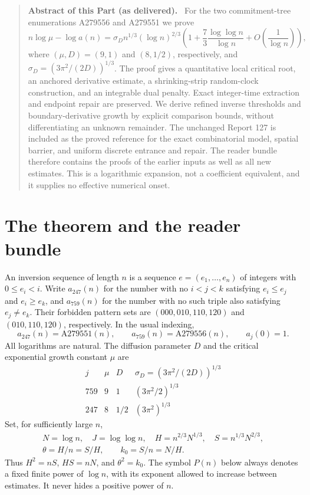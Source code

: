 \documentclass[11pt,letterpaper]{article}
\theoremstyle{remark}\newtheorem{remark}[theorem]{Remark}
\numberwithin{equation}{section}
\newenvironment{partabstract}{\begin{quote}\small\noindent\textbf{Abstract of this Part (as delivered).}\ }{\end{quote}}
\begin{document}
\begin{partabstract}
For the two commitment-tree enumerations A279556 and A279551 we prove
\[
 n\log\mu-\log a(n)=\sigma_D n^{1/3}(\log n)^{2/3}
 \left(1+\frac73\frac{\log\log n}{\log n}
                 +O\!\left(\frac1{\log n}\right)\right),
\]
where $(\mu,D)=(9,1)$ and $(8,1/2)$, respectively, and
$\sigma_D=(3\pi^2/(2D))^{1/3}$. The proof gives a quantitative local
critical root, an anchored derivative estimate, a shrinking-strip
random-clock construction, and an integrable dual penalty. Exact
integer-time extraction and endpoint repair are preserved. We derive
refined inverse thresholds and boundary-derivative growth by explicit
comparison bounds, without differentiating an unknown remainder.
The unchanged Report 127 is included as the proved reference for the
exact combinatorial model, spatial barrier, and uniform discrete
entrance and repair. The reader bundle therefore contains the proofs
of the earlier inputs as well as all new estimates. This is a
logarithmic expansion, not a coefficient equivalent, and it supplies
no effective numerical onset.
\end{partabstract}


\section{The theorem and the reader bundle}\label{ivd:ll:sec:theorem}
An inversion sequence of length $n$ is a sequence $e=(e_1,\ldots,e_n)$
of integers with $0\le e_i<i$. Write $a_{247}(n)$ for the number with
no $i<j<k$ satisfying $e_i\le e_j$ and $e_i\ge e_k$, and $a_{759}(n)$
for the number with no such triple also satisfying $e_j\ne e_k$.
Their forbidden pattern sets are $(000,010,110,120)$ and
$(010,110,120)$, respectively. In the usual indexing,
\[
 a_{247}(n)=\mathrm{A279551}(n),\qquad
 a_{759}(n)=\mathrm{A279556}(n),\qquad a_j(0)=1.
\]
All logarithms are natural. The diffusion parameter $D$ and the
critical exponential growth constant $\mu$ are
\[
\begin{array}{c|ccc}
 j&\mu&D&\sigma_D=(3\pi^2/(2D))^{1/3}\\\hline
 759&9&1&(3\pi^2/2)^{1/3}\\
 247&8&1/2&(3\pi^2)^{1/3}
\end{array}
\]
Set, for sufficiently large $n$,
\begin{equation}\label{ivd:ll:eq:scales}
 \begin{gathered}
 N=\log n,\quad J=\log\log n,\quad
 H=n^{2/3}N^{1/3},\quad S=n^{1/3}N^{2/3},\\
 \theta=H/n=S/H,\qquad k_0=S/n=N/H.
 \end{gathered}
\end{equation}
Thus $H^2=nS$, $HS=nN$, and $\theta^2=k_0$.
The symbol $P(n)$ below always denotes a fixed finite power of
$\log n$, with its exponent allowed to increase between estimates.
It never hides a positive power of $n$.
\end{document}
